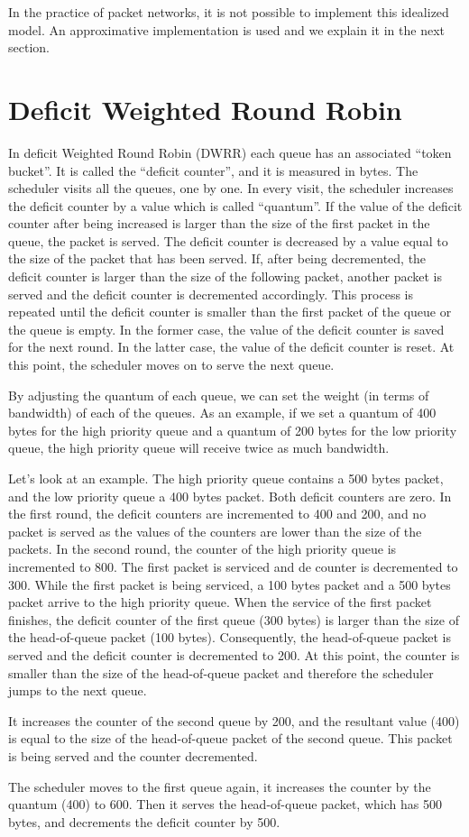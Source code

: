 In the practice of packet networks, it is not possible to implement this idealized model.
An approximative implementation is used and we explain it in the next section.

\section{Deficit Weighted Round Robin}

In deficit Weighted Round Robin (DWRR) each queue has an associated ``token bucket''.
It is called the ``deficit counter'', and it is measured in bytes.
The scheduler visits all the queues, one by one.
In every visit, the scheduler increases the deficit counter by a value which is called ``quantum''.
If the value of the deficit counter after being increased is larger than the size of the first packet in the queue, the packet is served.
The deficit counter is decreased by a value equal to the size of the packet that has been served.
If, after being decremented, the deficit counter is larger than the size of the following packet, another packet is served and the deficit counter is decremented accordingly.
This process is repeated until the deficit counter is smaller than the first packet of the queue or the queue is empty.
In the former case, the value of the deficit counter is saved for the next round.
In the latter case, the value of the deficit counter is reset.
At this point, the scheduler moves on to serve the next queue.

By adjusting the quantum of each queue, we can set the weight (in terms of bandwidth) of each of the queues.
As an example, if we set a quantum of 400 bytes for the high priority queue and a quantum of 200 bytes for the low priority queue, the high priority queue will receive twice as much bandwidth.

Let's look at an example.
The high priority queue contains a 500 bytes packet, and the low priority queue a 400 bytes packet.
Both deficit counters are zero.
In the first round, the deficit counters are incremented to 400 and 200, and no packet is served as the values of the counters are lower than the size of the packets.
In the second round, the counter of the high priority queue is incremented to 800.
The first packet is serviced and de counter is decremented to 300.
While the first packet is being serviced, a 100 bytes packet and a 500 bytes packet arrive to the high priority queue.
When the service of the first packet finishes, the deficit counter of the first queue (300 bytes) is larger than the size of the head-of-queue packet (100 bytes).
Consequently, the head-of-queue packet is served and the deficit counter is decremented to 200.
At this point, the counter is smaller than the size of the head-of-queue packet and therefore the scheduler jumps to the next queue.

It increases the counter of the second queue by 200, and the resultant value (400) is equal to the size of the head-of-queue packet of the second queue.
This packet is being served and the counter decremented.

The scheduler moves to the first queue again, it increases the counter by the quantum (400) to 600.
Then it serves the head-of-queue packet, which has 500 bytes, and decrements the deficit counter by 500.

